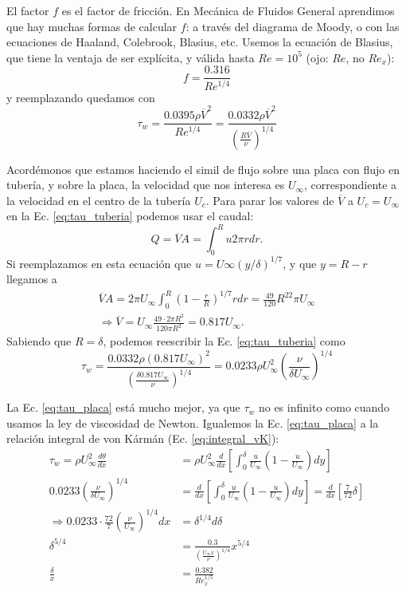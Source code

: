 El factor $f$ es el factor de fricción.
En Mecánica de Fluidos General aprendimos que hay muchas formas de calcular $f$: a través del diagrama de Moody, o con las ecuaciones de Haaland, Colebrook, Blasius, etc.
Usemos la ecuación de Blasius, que tiene la ventaja de ser explícita, y válida hasta $Re=10^5$ (ojo: $Re$, no $Re_x$):
%
\begin{equation}
f = \frac{0.316}{Re^{1/4}}
\end{equation}
%
y reemplazando quedamos con 
%
\begin{equation}\label{eq:tau_tuberia}
\tau_w = \frac{0.0395\rho\overline{V}^2}{Re^{1/4}} = \frac{0.0332\rho\overline{V}^2}{\left(\frac{R\overline{V}}{\nu}\right)^{1/4}}
\end{equation}

Acordémonos que estamos haciendo el simil de flujo sobre una placa con flujo en tubería, y sobre la placa, la velocidad que nos interesa es $U_\infty$, correspondiente a la velocidad en el centro de la tubería $U_c$.
Para parar los valores de $\overline{V}$ a $U_c=U_\infty$ en la Ec. \eqref{eq:tau_tuberia} podemos usar el caudal:
%
\begin{equation}
Q = \overline{V}A = \int_0^Ru2\pi r dr.
\end{equation}
%
Si reemplazamos en esta ecuación que $u=U\infty(y/\delta)^{1/7}$, y que $y=R-r$ llegamos a
%
\begin{align}
\overline{V}A=2\pi U_\infty\int_0^R\left(1-\frac{r}{R}\right)^{1/7}rdr = \frac{49}{120}R^22\pi U_\infty\nonumber\\
\Rightarrow \overline{V} = U_\infty\frac{49\cdot2\pi R^2}{120\pi R^2} = 0.817 U_\infty.
\end{align}
%
Sabiendo que $R=\delta$, podemos reescribir la Ec. \eqref{eq:tau_tuberia} como
%
\begin{equation}\label{eq:tau_placa}
\tau_w = \frac{0.0332\rho(0.817 U_\infty)^2}{\left(\frac{\delta0.817 U_\infty}{\nu}\right)^{1/4}} = 0.0233\rho U_\infty^2\left(\frac{\nu}{\delta U_\infty}\right)^{1/4}
\end{equation}

La Ec. \eqref{eq:tau_placa} está mucho mejor, ya que $\tau_w$ no es infinito como cuando usamos la ley de viscosidad de Newton.
Igualemos la Ec. \eqref{eq:tau_placa} a la relación integral de von Kármán (Ec. \eqref{eq:integral_vK}):
%
\begin{align}\label{eq:delta_turb}
\tau_w = \rho U_\infty^2\frac{d\theta}{dx} &= \rho U_\infty^2 \frac{d}{dx}\left[\int_0^\delta \frac{u}{U_\infty}\left(1-\frac{u}{U_\infty}\right)dy\right]\nonumber\\
0.0233 \left(\frac{\nu}{\delta U_\infty}\right)^{1/4} &= \frac{d}{dx}\left[\int_0^\delta \frac{u}{U_\infty}\left(1-\frac{u}{U_\infty}\right)dy\right] = \frac{d}{dx}\left[\frac{7}{72}\delta\right]\nonumber\\
\Rightarrow 0.0233\cdot\frac{72}{7}\left(\frac{\nu}{U_\infty}\right)^{1/4} dx &= \delta^{1/4}d\delta\nonumber\\
\delta^{5/4} &= \frac{0.3}{\left(\frac{U_\infty x}{\nu}\right)^{1/4}}x^{5/4}\nonumber\\
\frac{\delta}{x} &= \frac{0.382}{Re_x^{1/5}}
\end{align}

